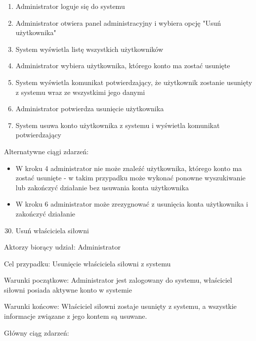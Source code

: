 \documentclass[
]{article}
\providecommand{\tightlist}{%
  \setlength{\itemsep}{0pt}\setlength{\parskip}{0pt}}
\begin{document}
\begin{enumerate}
\tightlist
\item
  {Administrator loguje się do systemu}
\item
  {Administrator otwiera panel administracyjny i wybiera opcję "Usuń
  użytkownika"}
\item
  {System wyświetla listę wszystkich użytkowników}
\item
  {Administrator wybiera użytkownika, którego konto ma zostać usunięte}
\item
  {System wyświetla komunikat potwierdzający, że użytkownik zostanie
  usunięty z systemu wraz ze wszystkimi jego danymi}
\item
  {Administrator potwierdza usunięcie użytkownika}
\item
  {System usuwa konto użytkownika z systemu i wyświetla komunikat
  potwierdzający}
\end{enumerate}

{Alternatywne ciągi zdarzeń:}

\begin{itemize}
\tightlist
\item
  {W kroku 4 administrator nie może znaleźć użytkownika, którego konto
  ma zostać usunięte - w takim przypadku może wykonać ponowne
  wyszukiwanie lub zakończyć działanie bez usuwania konta użytkownika}
\item
  {W kroku 6 administrator może zrezygnować z usunięcia konta
  użytkownika i zakończyć działanie}
\end{itemize}

{}

{}

{}

\begin{enumerate}
\setcounter{enumi}{29}
\tightlist
\item
  {Usuń właściciela siłowni}
\end{enumerate}

{Aktorzy biorący udział: Administrator}

{Cel przypadku: Usunięcie właściciela siłowni z systemu}

{Warunki początkowe: Administrator jest zalogowany do systemu,
właściciel siłowni posiada aktywne konto w systemie}

{Warunki końcowe: Właściciel siłowni zostaje usunięty z systemu, a
wszystkie informacje związane z jego kontem są usuwane.}

{Główny ciąg zdarzeń:}
\end{document}

